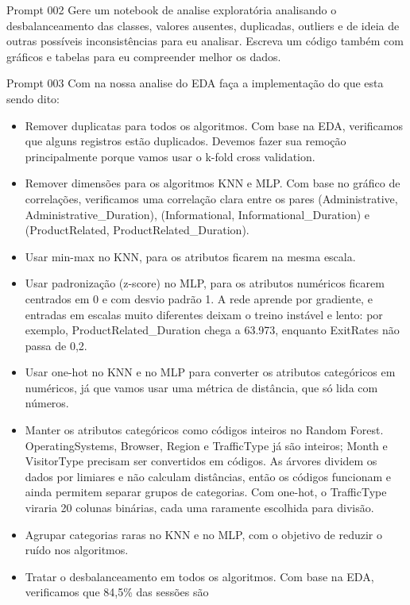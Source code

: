 \documentclass[11pt,a4paper]{article}
\begin{document}
\begin{prompt}{Prompt 002}
Gere um notebook de analise exploratória analisando o desbalanceamento das classes, valores ausentes, duplicadas,
outliers e de ideia de outras possíveis inconsistências para eu analisar. Escreva um código também com gráficos e
tabelas para eu compreender melhor os dados.
\end{prompt}

\begin{prompt}{Prompt 003}
Com na nossa analise do EDA faça a implementação do que esta sendo dito:
\begin{itemize}
  \item[--] Remover duplicatas para todos os algoritmos. Com base na EDA, verificamos que alguns registros estão
        duplicados. Devemos fazer sua remoção principalmente porque vamos usar o k-fold cross validation.
  \item[--] Remover dimensões para os algoritmos KNN e MLP. Com base no gráfico de correlações, verificamos uma
        correlação clara entre os pares (Administrative, Administrative\_Duration), (Informational,
        Informational\_Duration) e (ProductRelated, ProductRelated\_Duration).
  \item[--] Usar min-max no KNN, para os atributos ficarem na mesma escala.
  \item[--] Usar padronização (z-score) no MLP, para os atributos numéricos ficarem centrados em 0 e com desvio padrão
        1. A rede aprende por gradiente, e entradas em escalas muito diferentes deixam o treino instável e lento: por
        exemplo, ProductRelated\_Duration chega a 63.973, enquanto ExitRates não passa de 0,2.
  \item[--] Usar one-hot no KNN e no MLP para converter os atributos categóricos em numéricos, já que vamos usar uma
        métrica de distância, que só lida com números.
  \item[--] Manter os atributos categóricos como códigos inteiros no Random Forest. OperatingSystems, Browser, Region
        e TrafficType já são inteiros; Month e VisitorType precisam ser convertidos em códigos. As árvores dividem os
        dados por limiares e não calculam distâncias, então os códigos funcionam e ainda permitem separar grupos de
        categorias. Com one-hot, o TrafficType viraria 20 colunas binárias, cada uma raramente escolhida para divisão.
  \item[--] Agrupar categorias raras no KNN e no MLP, com o objetivo de reduzir o ruído nos algoritmos.
  \item[--] Tratar o desbalanceamento em todos os algoritmos. Com base na EDA, verificamos que 84,5\% das sessões são

\end{itemize}
\end{prompt}
\end{document}
